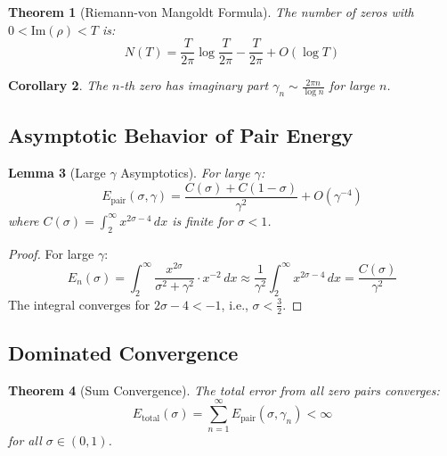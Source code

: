 \documentclass[12pt,a4paper]{article}
\newtheorem{theorem}{Theorem}[section]
\newtheorem{lemma}[theorem]{Lemma}
\newtheorem{corollary}[theorem]{Corollary}
\theoremstyle{definition}
\theoremstyle{remark}
\newcommand{\Epair}{E_{\text{pair}}}
\newcommand{\Etotal}{E_{\text{total}}}
\begin{document}
\begin{theorem}[Riemann-von Mangoldt Formula]
The number of zeros with $0 < \text{Im}(\rho) < T$ is:
\begin{equation}
N(T) = \frac{T}{2\pi}\log\frac{T}{2\pi} - \frac{T}{2\pi} + O(\log T)
\end{equation}
\end{theorem}

\begin{corollary}
The $n$-th zero has imaginary part $\gamma_n \sim \frac{2\pi n}{\log n}$ for large $n$.
\end{corollary}

\subsection{Asymptotic Behavior of Pair Energy}

\begin{lemma}[Large $\gamma$ Asymptotics]
\label{lem:asymptotics}
For large $\gamma$:
\begin{equation}
\Epair(\sigma, \gamma) = \frac{C(\sigma) + C(1-\sigma)}{\gamma^2} + O(\gamma^{-4})
\end{equation}
where $C(\sigma) = \int_2^\infty x^{2\sigma-4} \, dx$ is finite for $\sigma < 1$.
\end{lemma}

\begin{proof}
For large $\gamma$:
\begin{equation}
E_n(\sigma) = \int_2^\infty \frac{x^{2\sigma}}{\sigma^2 + \gamma^2} \cdot x^{-2} \, dx \approx \frac{1}{\gamma^2} \int_2^\infty x^{2\sigma-4} \, dx = \frac{C(\sigma)}{\gamma^2}
\end{equation}
The integral converges for $2\sigma - 4 < -1$, i.e., $\sigma < \frac{3}{2}$.
\end{proof}

\subsection{Dominated Convergence}

\begin{theorem}[Sum Convergence]
\label{thm:sum_convergence}
The total error from all zero pairs converges:
\begin{equation}
\Etotal(\sigma) = \sum_{n=1}^{\infty} \Epair(\sigma, \gamma_n) < \infty
\end{equation}
for all $\sigma \in (0, 1)$.
\end{theorem}
\end{document}
